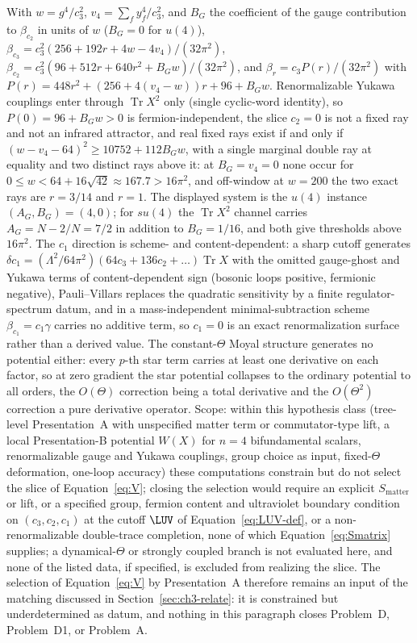 With \(w=g^4/c_3^2\), \(v_4=\sum_f y_f^4/c_3^2\), and \(B_G\) the coefficient of the gauge contribution to \(\beta_{c_2}\) in units of \(w\) (\(B_G=0\) for \(u(4)\)), \(\beta_{c_3}=c_3^2(256+192r+4w-4v_4)/(32\pi^2)\), \(\beta_{c_2}=c_3^2(96+512r+640r^2+B_Gw)/(32\pi^2)\), and \(\beta_r=c_3P(r)/(32\pi^2)\) with \(P(r)=448r^2+(256+4(v_4-w))r+96+B_Gw\).
Renormalizable Yukawa couplings enter through \(\operatorname{Tr}X^2\) only (single cyclic-word identity), so \(P(0)=96+B_Gw>0\) is fermion-independent, the slice \(c_2=0\) is not a fixed ray and not an infrared attractor, and real fixed rays exist if and only if \((w-v_4-64)^2\ge10752+112B_Gw\), with a single marginal double ray at equality and two distinct rays above it: at \(B_G=v_4=0\) none occur for \(0\le w<64+16\sqrt{42}\approx167.7>16\pi^2\), and off-window at \(w=200\) the two exact rays are \(r=3/14\) and \(r=1\). The displayed system is the \(u(4)\) instance \((A_G,B_G)=(4,0)\); for \(su(4)\) the \(\operatorname{Tr}X^2\) channel carries \(A_G=N-2/N=7/2\) in addition to \(B_G=1/16\), and both give thresholds above \(16\pi^2\).
The \(c_1\) direction is scheme- and content-dependent: a sharp cutoff generates \(\delta c_1=(\Lambda^2/64\pi^2)(64c_3+136c_2+\ldots)\operatorname{Tr}X\) with the omitted gauge-ghost and Yukawa terms of content-dependent sign (bosonic loops positive, fermionic negative), Pauli--Villars replaces the quadratic sensitivity by a finite regulator-spectrum datum, and in a mass-independent minimal-subtraction scheme \(\beta_{c_1}=c_1\gamma\) carries no additive term, so \(c_1=0\) is an exact renormalization surface rather than a derived value.
The constant-\(\Theta\) Moyal structure generates no potential either: every \(p\)-th star term carries at least one derivative on each factor, so at zero gradient the star potential collapses to the ordinary potential to all orders, the \(O(\Theta)\) correction being a total derivative and the \(O(\Theta^2)\) correction a pure derivative operator.
Scope: within this hypothesis class (tree-level Presentation~A with unspecified matter term or commutator-type lift, a local Presentation-B potential \(W(X)\) for \(n=4\) bifundamental scalars, renormalizable gauge and Yukawa couplings, group choice as input, fixed-\(\Theta\) deformation, one-loop accuracy) these computations constrain but do not select the slice of Equation~\eqref{eq:V}; closing the selection would require an explicit \(S_{\mathrm{matter}}\) or lift, or a specified group, fermion content and ultraviolet boundary condition on \((c_3,c_2,c_1)\) at the cutoff \(\LUV\) of Equation~\eqref{eq:LUV-def}, or a non-renormalizable double-trace completion, none of which Equation~\eqref{eq:Smatrix} supplies; a dynamical-\(\Theta\) or strongly coupled branch is not evaluated here, and none of the listed data, if specified, is excluded from realizing the slice.
The selection of Equation~\eqref{eq:V} by Presentation~A therefore remains an input of the matching discussed in Section~\ref{sec:ch3-relate}: it is constrained but underdetermined as datum, and nothing in this paragraph closes Problem~D, Problem~D1, or Problem~A.

